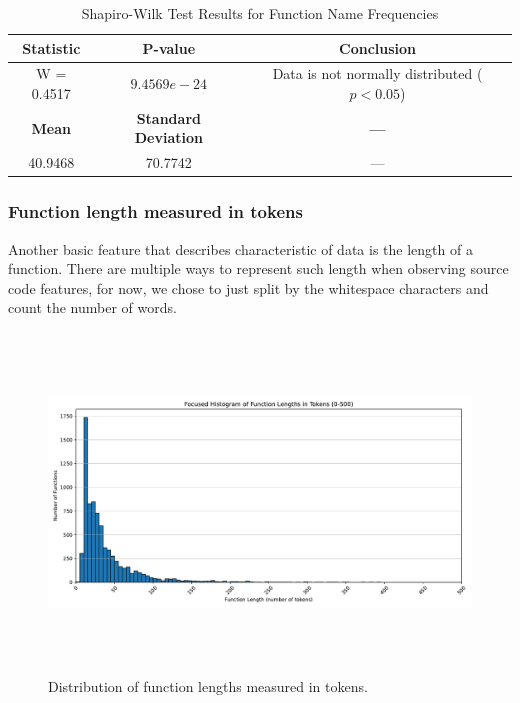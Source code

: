 \documentclass[10pt,english,a4paper]{report}
\begin{document}
\begin{table}[h!]
    \centering
    \caption{Shapiro-Wilk Test Results for Function Name Frequencies}
    \label{tab:shapiro_wilk_names}
    \begin{tabular}{|c|c|c|}
        \hline
        \textbf{Statistic} & \textbf{P-value} & \textbf{Conclusion} \\
        \hline
        W = 0.4517 & $9.4569e-24$ & Data is not normally distributed ($p < 0.05$) \\
        \hline
        \textbf{Mean} & \textbf{Standard Deviation} & \textbf{---} \\
        \hline
        40.9468 & 70.7742 & --- \\
        \hline
    \end{tabular}
\end{table}


\subsubsection{Function length measured in tokens}

Another basic feature that describes characteristic of data is the length of a function. There are multiple ways to represent such length when observing source code features, for now, we chose
to just split by the whitespace characters and count the number of words.

\begin{figure}[H]
    \centering
    \includegraphics[width=16cm, height=9cm]{figures/ast_length_merged.pdf}
    \caption{Distribution of function lengths measured in tokens.}
    \label{fig:func_lengths_distr_merged}
\end{figure}
\end{document}

